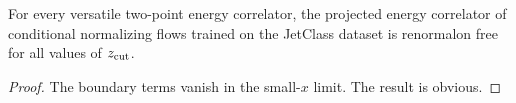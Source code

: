 \begin{lemma}[Interpretability]\label{thm:3}
For every versatile two-point energy correlator, the projected energy
correlator of conditional normalizing flows trained on the JetClass
dataset is renormalon free for all values of $z_{\rm cut}$.
\end{lemma}

\begin{proof}
The boundary terms vanish in the small-$x$ limit. The result is obvious.
\end{proof}

